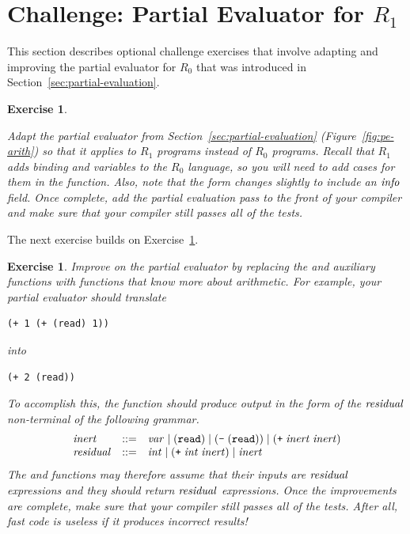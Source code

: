 \documentclass[11pt]{book}
\newtheorem{exercise}[theorem]{Exercise}
\begin{document}
\section{Challenge: Partial Evaluator for $R_1$}
\label{sec:pe-R1}

This section describes optional challenge exercises that involve
adapting and improving the partial evaluator for $R_0$ that was
introduced in Section~\ref{sec:partial-evaluation}.

\begin{exercise}\label{ex:pe-R1}
\normalfont
  
Adapt the partial evaluator from Section~\ref{sec:partial-evaluation}
(Figure~\ref{fig:pe-arith}) so that it applies to $R_1$ programs
instead of $R_0$ programs. Recall that $R_1$ adds  binding
and variables to the $R_0$ language, so you will need to add cases for
them in the  function. Also, note that the 
form changes slightly to include an $\mathit{info}$ field.  Once
complete, add the partial evaluation pass to the front of your
compiler and make sure that your compiler still passes all of the
tests.
\end{exercise}

The next exercise builds on Exercise~\ref{ex:pe-R1}.

\begin{exercise}
\normalfont

Improve on the partial evaluator by replacing the  and
 auxiliary functions with functions that know more about
arithmetic. For example, your partial evaluator should translate
\begin{lstlisting}
(+ 1 (+ (read) 1))
\end{lstlisting}
into
\begin{lstlisting}
(+ 2 (read))
\end{lstlisting}
To accomplish this, the  function should produce output
in the form of the $\mathit{residual}$ non-terminal of the following
grammar.
\[
\begin{array}{lcl}
\mathit{inert} &::=& \mathit{var} \mid (\texttt{read}) \mid (\texttt{-} \;(\texttt{read}))
      \mid (\texttt{+} \; \mathit{inert} \; \mathit{inert})\\
\mathit{residual} &::=& \mathit{int} \mid (\texttt{+}\; \mathit{int}\; \mathit{inert}) \mid \mathit{inert}
\end{array}
\]
The  and  functions may therefore assume
that their inputs are $\mathit{residual}$ expressions and they should
return $\mathit{residual}$ expressions.  Once the improvements are
complete, make sure that your compiler still passes all of the tests.
After all, fast code is useless if it produces incorrect results!
\end{exercise}
\end{document}
